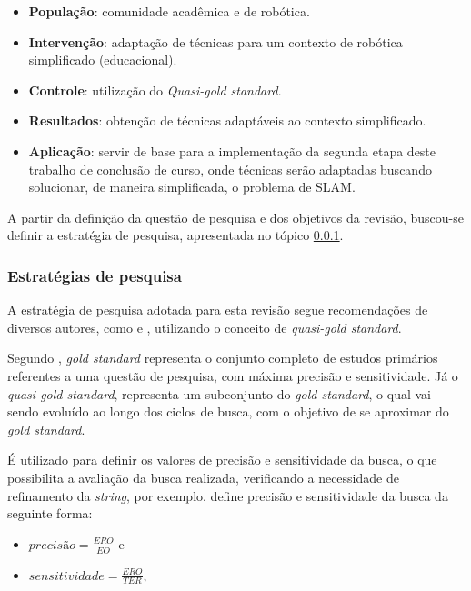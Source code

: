 		\begin{itemize}
			\item \textbf{População}: comunidade acadêmica e de robótica.
			\item \textbf{Intervenção}: adaptação de técnicas para um contexto de robótica simplificado (educacional).
			\item \textbf{Controle}: utilização do \textit{Quasi-gold standard}.
			\item \textbf{Resultados}: obtenção de técnicas adaptáveis ao contexto simplificado.
			\item \textbf{Aplicação}: servir de base para a implementação da segunda etapa deste trabalho de conclusão de curso, onde técnicas serão adaptadas buscando solucionar, de maneira simplificada, o problema de SLAM.

		\end{itemize} 

		A partir da definição da questão de pesquisa e dos objetivos da revisão, buscou-se definir a estratégia de pesquisa, apresentada no tópico \ref{sub:estrategias_pesquisa}.

		\subsubsection{Estratégias de pesquisa}
		\label{sub:estrategias_pesquisa}

		A estratégia de pesquisa adotada para esta revisão segue recomendações de diversos autores, como \cite{Kitchenham} e \cite{systematicReviewEngSoft}, utilizando o conceito de \textit{quasi-gold standard}.

		Segundo \cite{quasi_goldES}, \textit{gold standard} representa o conjunto completo de estudos primários referentes a uma questão de pesquisa, com máxima precisão e sensitividade. Já o \textit{quasi-gold standard}, representa um subconjunto do \textit{gold standard}, o qual vai sendo evoluído ao longo dos ciclos de busca, com o objetivo de se aproximar do \textit{gold standard}. 

		É utilizado para definir os valores de precisão e sensitividade da busca, o que possibilita a avaliação da busca realizada, verificando a necessidade de refinamento da \textit{string}, por exemplo. \cite{quasi_goldES} define precisão e sensitividade da busca da seguinte forma:

		\begin{itemize}

			\item $precisão = \frac{ERO}{EO}$ e

			\item $sensitividade = \frac{ERO}{TER}$,
		\end{itemize}

